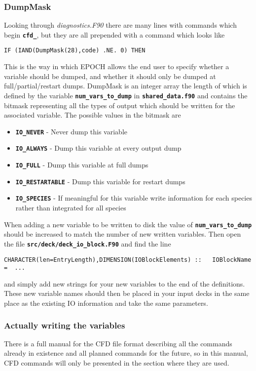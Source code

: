 \documentclass[12pt]{article}
\newcommand{\simpleboxverbatim}{\begin{Verbatim}[obeytabs=true,frame=single,
  framerule=0.5mm,rulecolor=\color{warwickmid}]}
\newcommand{\inlinecode}[1]{{\color{warwickred} \bf\texttt{#1}}}
\newcommand{\EPOCH}{{\color{warwickdark}\fontfamily{phv}\selectfont EPOCH} }
\begin{document}
\subsubsection{DumpMask}
Looking through {\it diagnostics.F90} there are many lines with commands which
begin \inlinecode{cfd\_}, but they are all prepended with a command which looks
like
\simpleboxverbatim
     IF (IAND(DumpMask(28),code) .NE. 0) THEN
\end{Verbatim}
This is the way in which \EPOCH allows the end user to specify whether a
variable should be dumped, and whether it should only be dumped at
full/partial/restart dumps. DumpMask is an integer array the length of which is
defined by the variable \inlinecode{num\_vars\_to\_dump} in
\inlinecode{shared\_data.f90} and contains the bitmask representing all the
types of output which should be written for the associated variable. The
possible values in the bitmask are

\begin{itemize}
\item \inlinecode{IO\_NEVER} - Never dump this variable
\item \inlinecode{IO\_ALWAYS} - Dump this variable at every output dump
\item \inlinecode{IO\_FULL} - Dump this variable at full dumps
\item \inlinecode{IO\_RESTARTABLE} - Dump this variable for restart dumps
\item \inlinecode{IO\_SPECIES} - If meaningful for this variable write
  information for each species rather than integrated for all species
\end{itemize}

When adding a new variable to be written to disk the value of
\inlinecode{num\_vars\_to\_dump} should be increased to match the number of new
written variables. Then open the file \inlinecode{src/deck/deck\_io\_block.F90}
and find the line
\simpleboxverbatim
  CHARACTER(len=EntryLength),DIMENSION(IOBlockElements) ::   IOBlockName =  ...
\end{Verbatim}

and simply add new strings for your new variables to the end of the
definitions. These new variable names should then be placed in your input decks
in the same place as the existing IO information and take the same parameters.

\subsubsection{Actually writing the variables}
There is a full manual for the CFD file format describing all the commands
already in existence and all planned commands for the future, so in this
manual, CFD commands will only be presented in the section where they are used.
\end{document}
